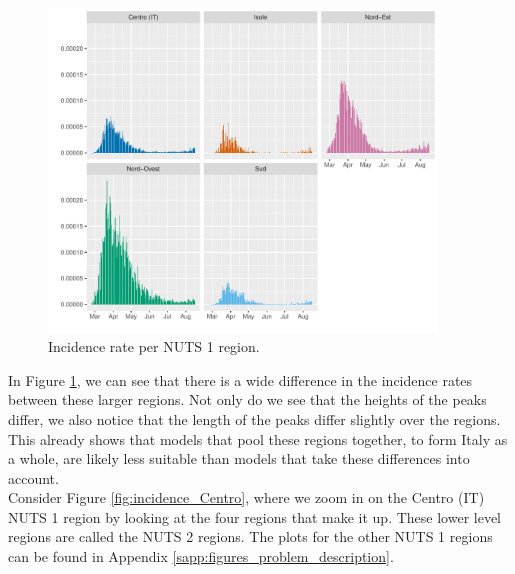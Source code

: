 \documentclass[12pt]{article}
\begin{document}
	\begin{figure}[H]
	    \centering
	    \includegraphics[width=0.92\textwidth]{output/infective_rate_per_NUTS1.pdf}
	    \caption{Incidence rate per NUTS 1 region.}
	    \label{fig:incidence_per_NUTS1}
	\end{figure}
	
	In Figure \ref{fig:incidence_per_NUTS1}, we can see that there is a wide difference in the incidence rates between these larger regions. Not only do we see that the heights of the peaks differ, we also notice that the length of the peaks differ slightly over the regions. This already shows that models that pool these regions together, to form Italy as a whole, are likely less suitable than models that take these differences into account. \\
	
	Consider Figure \ref{fig:incidence_Centro}, where we zoom in on the Centro (IT) NUTS 1 region by looking at the four regions that make it up. These lower level regions are called the NUTS 2 regions. The plots for the other NUTS 1 regions can be found in Appendix \ref{sapp:figures_problem_description}. 
	
\end{document}
